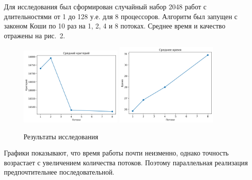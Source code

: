 \documentclass[12pt]{article}
\begin{document}
Для исследования был сформирован случайный набор 2048 работ с длительностями
от 1 до 128 у.е. для 8 процессоров. Алгоритм был запущен с законом Коши
по 10 раз на 1, 2, 4 и 8 потоках. Среднее время и качество отражены на рис.~2.

\begin{figure}[!h]
    \centering
    \includegraphics[width=0.45\textwidth,keepaspectratio]{criterion.png}
    \includegraphics[width=0.45\textwidth,keepaspectratio]{time.png}
    \caption{Результаты исследования}
\end{figure}

Графики показывают, что время работы почти неизменно, однако точность
возрастает с увеличением количества потоков. Поэтому параллельная реализация
предпочтительнее последовательной.
\end{document}
